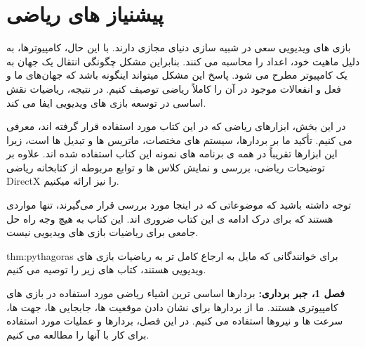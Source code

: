 \newpage

\part{پیشنیاز های ریاضی}
{
    \Large
    \begin{spacing}{1.5}
        بازی های ویدیویی سعی در شبیه سازی دنیای مجازی دارند.
        با این حال، کامپیوترها، به دلیل ماهیت خود، اعداد را محاسبه می کنند. بنابراین مشکل چگونگی انتقال یک جهان به یک کامپیوتر مطرح می شود.
        پاسخ این مشکل میتواند اینگونه باشد که جهان‌های ما و فعل و انفعالات موجود در آن را کاملاً ریاضی توصیف کنیم.
        در نتیجه، ریاضیات نقش اساسی در توسعه بازی های ویدیویی ایفا می کند.

        در این بخش، ابزارهای ریاضی که در این کتاب مورد استفاده قرار گرفته اند، معرفی می کنیم. تأکید ما بر بردارها، سیستم های مختصات، ماتریس ها و تبدیل ها است، زیرا این ابزارها تقریباً در همه ی برنامه های نمونه این کتاب استفاده شده اند.
        علاوه بر توضیحات ریاضی، بررسی و نمایش کلاس ها و توابع مربوطه از کتابخانه ریاضی DirectX را نیز ارائه میکنیم.

        توجه داشته باشید که موضوعاتی که در اینجا مورد بررسی قرار می‌گیرند، تنها مواردی هستند که برای درک ادامه ی این کتاب ضروری اند.
        این کتاب به هیچ وجه راه حل جامعی برای ریاضیات بازی های ویدیویی نیست.

        \textbf{\vspace{20pt}}
        \begin{theo}{thm:pythagoras}
            \Large
            برای خوانندگانی که مایل به ارجاع کامل تر به ریاضیات بازی های ویدیویی هستند، کتاب های زیر را توصیه می کنیم.
        \end{theo}
        \textbf{\vspace{40pt}}

        \textbf{فصل 1، جبر برداری:} بردارها اساسی ترین اشیاء ریاضی مورد استفاده در بازی های کامپیوتری هستند.
        ما از بردارها برای نشان دادن موقعیت ها، جابجایی ها، جهت ها، سرعت ها و نیروها استفاده می کنیم.
        در این فصل، بردارها و عملیات مورد استفاده برای کار با آنها را مطالعه می کنیم.


\end{spacing}}
